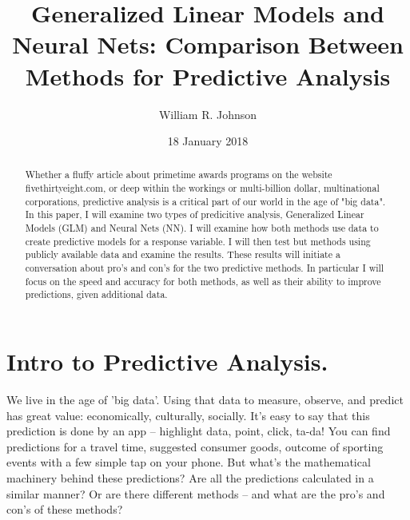 \documentclass[12pt]{article}
\begin{document}
\title{Generalized Linear Models and Neural Nets: Comparison Between Methods for Predictive Analysis}
\author{William R. Johnson}
\date{18 January 2018}
\maketitle

\renewcommand{\abstractname}{Abstract:}
\begin{abstract}
Whether a fluffy article about primetime awards programs on the website fivethirtyeight.com, or deep within the workings or multi-billion dollar, 
multinational corporations, predictive analysis is a critical part of our world in the age of "big data".  In this paper, I will examine two types
of predicitive analysis, Generalized Linear Models (GLM) and Neural Nets (NN).  I will examine how both methods use data to create predictive 
models for a response variable.  I will then test but methods using publicly available data and examine the results.  These results will initiate
a conversation about pro's and con's for the two predictive methods.  In particular I will focus on the speed and accuracy for both methods, as well
as their ability to improve predictions, given additional data.
\end{abstract}
\vfill\eject




\section{Intro to Predictive Analysis.}
We live in the age of 'big data'.  Using that data to measure, observe, and predict has great value:  economically, culturally, socially.  It's 
easy to say that this prediction is done by an app -- highlight data, point, click, ta-da!  You can find predictions for a travel time, suggested
consumer goods, outcome of sporting events with a few simple tap on your phone.  But what's the mathematical machinery behind these predictions?
Are all the predictions calculated in a similar manner?  Or are there different methods -- and what are the pro's and con's of these methods?
\end{document}
